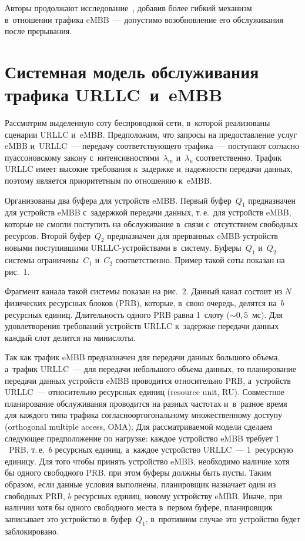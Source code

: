 \begin{multicols}{2}
Авторы продолжают 
исследование~\cite{Makeeva2019}, добавив более гибкий механизм в~отношении трафика \mbox{eMBB}~--- 
допустимо возобновление его обслуживания после прерывания.


\section{Системная модель обслуживания трафика URLLC~и~\mbox{eMBB}}

Рассмотрим выделенную соту беспроводной сети, в~которой реализованы сценарии URLLC и~\mbox{eMBB}. 
Предположим, что запросы на предостав\-ле\-ние услуг \mbox{eMBB} и~URLLC~--- передачу соответствующего 
трафика~--- поступают согласно пуассоновскому закону с~интенсивностями~$\lambda_{m}$ и~$\lambda_{u}$ соответственно. Трафик URLLC имеет высокие требования к~задержке и~надежности 
передачи данных, поэтому является приоритетным по отношению к~\mbox{eMBB}.

Организованы два буфера для устройств \mbox{eMBB}. Первый буфер~$Q_1$ предназначен для устройств 
\mbox{eMBB} с~задержкой передачи данных, т.\,е.\ для устройств \mbox{eMBB}, которые не смогли поступить на 
обслуживание в~связи с~отсутствием свободных ресурсов. Второй буфер~$Q_2$ предназначен для прерванных 
\mbox{eMBB}-устрой\-ств новыми поступившими URLLC-устрой\-ст\-ва\-ми в~систему. Буферы~$Q_1$ и~$Q_2$ системы 
ограничены~$C_1$ и~$C_2$ соответственно. Пример такой соты показан на рис.~1.



Фрагмент канала такой системы показан на  рис.~2. Данный канал состоит 
из $N$ физических ресурсных блоков (PRB), которые, в~свою очередь, делятся на~$b$ ресурсных единиц. 
Длительность одного PRB равна 1~слоту ($\sim0{,}5$~мс). Для удовлетворения требований устройств 
URLLC к~задержке передачи данных каждый слот делится на минислоты.

Так как трафик \mbox{eMBB} предназначен для передачи данных большого объема, а~трафик URLLC~--- для 
передачи небольшого объема данных, то планирование передачи данных устройств \mbox{eMBB}\linebreak
 проводится относительно 
PRB, а~устройств URLLC~--- относительно ресурсных единиц
(resource unit, RU). Совместное планирование обслуживания проводится 
на разных частотах и~в~разное время для каждого типа трафика согласно\linebreak ортогональному множественному доступу 
(orthogonal multiple access, OMA). Для рассматриваемой модели сделаем следующее предположение по нагрузке:
 каждое устройство \mbox{eMBB}
 требует $1$~PRB, т.\,е.\ $b$ ресурсных единиц, а~каждое устройство URLLC~--- $1$~ресурсную единицу.
Для того чтобы принять устройство \mbox{eMBB}, необходимо наличие хотя бы одного свободного PRB, 
при этом буферы должны быть пусты. Таким образом, если данные условия выполнены, планировщик назначает 
один из свободных PRB, $b$ ресурсных единиц, новому устройству \mbox{eMBB}. Иначе, при наличии хотя бы одного 
свободного места в~первом буфере, планировщик записывает это устройство в~буфер~$Q_1$, в~противном случае 
это устройство будет заблокировано.


\end{multicols}
